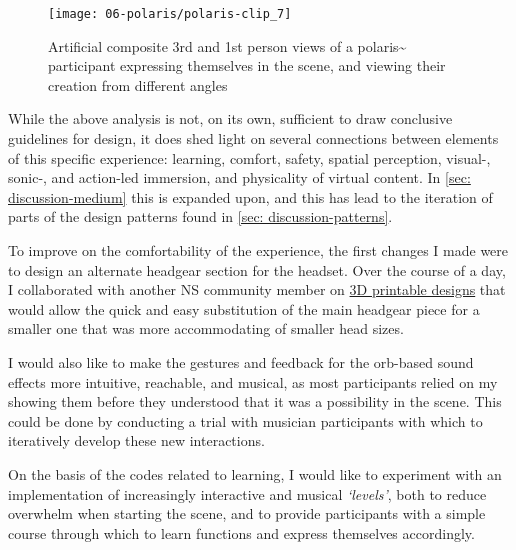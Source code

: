 \begin{figure}[ht]
    \centering
    \texttt{[image: 06-polaris/polaris-clip\_7]}
    \captionsetup{justification=centering,margin=1.5cm}
    \caption{Artificial composite 3rd and 1st person views of a polaris\textasciitilde{} participant expressing themselves in the scene, and viewing their creation from different angles \citep[from][\href{https://youtu.be/H8d3n7eNKAg}{clip URL}]{bilbow2022}}\label{fig: polaris-clip_7}
\end{figure}

While the above analysis is not, on its own, sufficient to draw conclusive guidelines for design, it does shed light on several connections between elements of this specific experience: learning, comfort, safety, spatial perception, visual-, sonic-, and action-led immersion, and physicality of virtual content. In \autoref{sec: discussion-medium} this is expanded upon, and this has lead to the iteration of parts of the design patterns found in \autoref{sec: discussion-patterns}.

To improve on the comfortability of the experience, the first changes I made were to design an alternate headgear section for the headset. Over the course of a day, I collaborated with another NS community member on \href{https://github.com/AheadIO/Deck-X/tree/main/Deck_X/STL_files/Headgear/Welding_Headgear_Adaptor}{3D printable designs} that would allow the quick and easy substitution of the main headgear piece for a smaller one that was more accommodating of smaller head sizes.

I would also like to make the gestures and feedback for the orb-based sound effects more intuitive, reachable, and musical, as most participants relied on my showing them before they understood that it was a possibility in the scene. This could be done by conducting a trial with musician participants with which to iteratively develop these new interactions. 

On the basis of the codes related to learning, I would like to experiment with an implementation of increasingly interactive and musical \textit{`levels'}, both to reduce overwhelm when starting the scene, and to provide participants with a simple course through which to learn functions and express themselves accordingly.